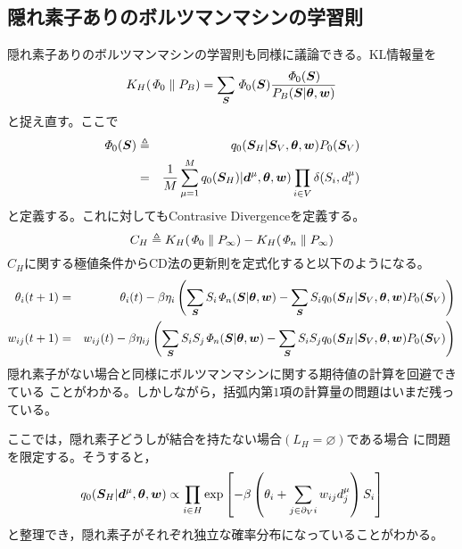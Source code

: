\subsection{隠れ素子ありのボルツマンマシンの学習則}
隠れ素子ありのボルツマンマシンの学習則も同様に議論できる。KL情報量を
\begin{equation}
K_{H}(\mathit{\Phi}_{0}\parallel P_{B})=\sum_{\bm{S}}\mathit{\Phi}_{0}(\bm{S})
\frac{\mathit{\Phi}_{0}(\bm{S})}{P_{B}(\bm{S}|\boldsymbol{\theta},\bm{w})}\label{eq:3.14}
\end{equation}
と捉え直す。ここで
\begin{eqnarray}
\mathit{\Phi}_{0}(\bm{S})&\triangleq&q_{0}(\bm{S}_{H}|\bm{S}_{V},\boldsymbol{\theta},\bm{w})P_{0}(\bm{S}_{V})
\label{eq:3.15}\\
&=&\frac{1}{M}\sum_{\mu=1}^{M}q_{0}(\bm{S}_{H})|\bm{d}^{\mu},\boldsymbol{\theta},\bm{w})
\prod_{i\in V}\delta(S_{i},d_{i}^{\mu})\label{eq:3.16}
\end{eqnarray}
と定義する。これに対してもContrasive Divergenceを定義する。
\begin{equation}
C_{H}\triangleq K_{H}(\mathit{\Phi}_{0}\parallel P_{\infty})
-K_{H}(\mathit{\Phi}_{n}\parallel P_{\infty})\label{eq:3.17}
\end{equation}
$C_{H}$に関する極値条件からCD法の更新則を定式化すると以下のようになる。
\begin{eqnarray}
\theta_{i}(t+1)&=&\theta_{i}(t)-\beta\eta_{i}\left(
\sum_{\bm{S}}S_{i}\mathit{\Phi}_{n}(\bm{S}|\boldsymbol{\theta},\bm{w})
-\sum_{\bm{S}}S_{i}q_{0}(\bm{S}_{H}|\bm{S}_{V},\boldsymbol{\theta},\bm{w})
P_{0}(\bm{S}_{V})\right)\label{eq:3.27}\\
w_{ij}(t+1)&=&w_{ij}(t)-\beta\eta_{ij}
\left(\sum_{\bm{S}}S_{i}S_{j}\mathit{\Phi}_{n}(\bm{S}|\boldsymbol{\theta},\bm{w})
-\sum_{\bm{S}}S_{i}S_{j}q_{0}(\bm{S}_{H}|\bm{S}_{V},\boldsymbol{\theta},\bm{w})P_{0}
(\bm{S}_{V})\right)\label{eq:3.28}
\end{eqnarray}
隠れ素子がない場合と同様にボルツマンマシンに関する期待値の計算を回避できている
ことがわかる。しかしながら，括弧内第$1$項の計算量の問題はいまだ残っている。

ここでは，隠れ素子どうしが結合を持たない場合$(L_{H}=\varnothing)$である場合
に問題を限定する。そうすると，
\begin{equation}
q_{0}(\bm{S}_{H}|\bm{d}^{\mu},\boldsymbol{\theta},\bm{w})
\propto\prod_{i\in H}\exp\left[
-\beta\left(\theta_{i}+\sum_{j\in\partial_{V}i}w_{ij}d_{j}^{\mu}\right)S_{i}
\right]\label{eq:3.35}
\end{equation}
と整理でき，隠れ素子がそれぞれ独立な確率分布になっていることがわかる。